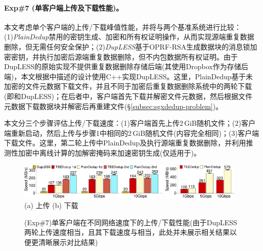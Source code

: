 \paragraph*{Exp\#7 (单客户端上传及下载性能)。}本文考虑单个客户端的上传/下载峰值性能，并将\sysnameS 与两个基准系统进行比较：(1)\textit{PlainDedup}禁用\sysnameS 的密钥生成、加密和所有权证明操作，从而实现源端重复数据删除，但无需任何安全保护；(2)\textit{DupLESS}\cite{bellare2013DupLESS}基于OPRF-RSA生成数据块的消息锁加密密钥，并执行加密后源端重复数据删除，但不内包数据所有权证明。由于DupLESS的原始实现不提供重复数据删除存储后端(其使用Dropbox作为存储后端)，本文根据\cite{bellare2013DupLESS}中描述的设计使用C++实现DupLESS。这里，PlainDedup基于未加密的文件元数据下载文件，并且不同于加密后重复数据删除系统中的两轮下载(即\sysnameS 和DupLESS)；在后者中，客户端首先下载并解密文件元数据，然后根据文件元数据下载数据块并解密后再重建文件(\S\ref{subsec:sgxdedup-problem})。

本文分三个步骤评估上传/下载速度：(1)客户端首先上传2\,GiB随机文件；(2)客户端重新启动，然后上传与步骤1中相同的2\,GiB随机文件(内容完全相同)；(3)客户端下载文件。这里，第二轮上传中PlainDedup及\sysnameS 执行源端重复数据删除，并利用推测性加密中离线计算的加解密掩码来加速密钥生成(仅适用于\sysnameS)。

\begin{figure}[!htb]
    \centering
    \includegraphics[width=0.646\textwidth]{pic/sgxdedup/upload_network_speed_bar.pdf}
    \includegraphics[width=0.324\textwidth]{pic/sgxdedup/download_network_speed_bar.pdf}
    \\
    \hspace{1.1in} {\small (a) 上传} \hspace{1.9in}
    {\small (b) 下载}\\
    \caption{(Exp\#7)单客户端在不同网络速度下的上传/下载性能(由于DupLESS两轮上传速度相当，且其下载速度与\sysnameS 相当，此处并未展示相关结果以便更清晰展示对比结果)}
    \label{fig:sgxdedup-singleClientThroughput}
\end{figure}

